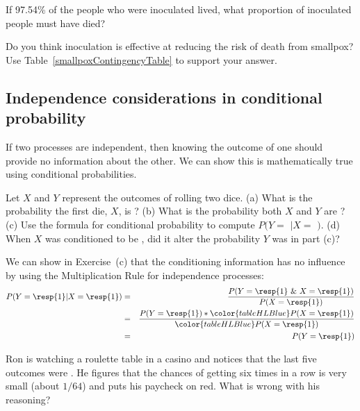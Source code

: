 \begin{exercise}
If 97.54\% of the people who were inoculated lived, what proportion of inoculated people must have died?
\end{exercise}

\begin{exercise}
Do you think inoculation is effective at reducing the risk of death from smallpox? Use Table~\ref{smallpoxContingencyTable} to support your answer.
\end{exercise}

\subsection{Independence considerations in conditional probability}

If two processes are independent, then knowing the outcome of one should provide no information about the other. We can show this is mathematically true using conditional probabilities.

\begin{exercise} \label{condProbOfRollingA1AfterOne1}
Let $X$ and $Y$ represent the outcomes of rolling two dice. (a) What is the probability the first die, $X$, is ? (b) What is the probability both $X$ and $Y$ are ? (c) Use the formula for conditional probability to compute $P(Y =$  $| X = $ $)$. (d) When $X$ was conditioned to be , did it alter the probability $Y$ was  in part (c)?
\end{exercise}

We can show in Exercise~(c) that the conditioning information has no influence by using the Multiplication Rule for independence processes:
\begin{eqnarray*}
P(Y=\text{\resp{1}}|X=\text{\resp{1}})
	&=& \frac{P(Y=\text{\resp{1} \& }X=\text{\resp{1}})}{P(X=\text{\resp{1}})} \\
	&=& \frac{P(Y=\text{\resp{1}})*\color{tableHLBlue}P(X=\text{\resp{1}})}{\color{tableHLBlue}P(X=\text{\resp{1}})} \\
	&=& P(Y=\text{\resp{1}}) \\
\end{eqnarray*}

\begin{exercise}
Ron is watching a roulette table in a casino and notices that the last five outcomes were . He figures that the chances of getting  six times in a row is very small (about $1/64$) and puts his paycheck on red. What is wrong with his reasoning?
\end{exercise}

